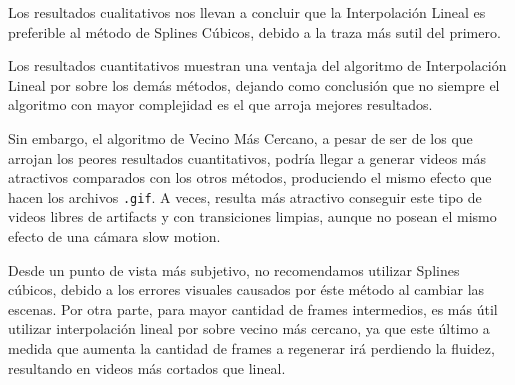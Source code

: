 \par Los resultados cualitativos nos llevan a concluir que la Interpolaci\'on Lineal es preferible al m\'etodo de Splines C\'ubicos, debido a la traza m\'as sutil del primero.
\par Los resultados cuantitativos muestran una ventaja del algoritmo de Interpolación Lineal por sobre los demás métodos, dejando como conclusión que no siempre el algoritmo con mayor complejidad es el que arroja mejores resultados. 
\par Sin embargo, el algoritmo de Vecino Más Cercano, a pesar de ser de los que arrojan los peores resultados cuantitativos, podría llegar a generar videos más atractivos comparados con los otros métodos, produciendo el mismo efecto que hacen los archivos \texttt{.gif}. 
A veces, resulta más atractivo conseguir este tipo de videos libres de artifacts y con transiciones limpias, aunque no posean el mismo efecto de una cámara slow motion.
\par Desde un punto de vista más subjetivo, no recomendamos utilizar Splines cúbicos, debido a los errores visuales causados por \'este m\'etodo al cambiar las escenas.
Por otra parte, para mayor cantidad de frames intermedios, es más útil utilizar interpolaci\'on lineal por sobre vecino m\'as cercano, ya que este último a medida que aumenta la cantidad de frames a regenerar irá perdiendo la fluidez, resultando en videos m\'as cortados que lineal.
